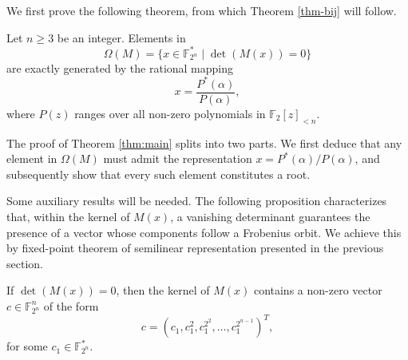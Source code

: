 \documentclass[hidelinks,onefignum,onetabnum]{siamart251216}
\theoremstyle{definition}
\theoremstyle{remark}
\begin{document}
We first prove the following theorem, from which Theorem \ref{thm-bij} will follow.


\begin{theorem}
	\label{thm:main}
	Let $n\ge 3$ be an integer. Elements in $$\Omega (M)=\{ x\in\mathbb F_{2^n}^*\mid \det (M(x))=0\}$$ are exactly generated by the rational mapping
	$$
	x = \frac{P^*(\alpha)}{P(\alpha)},
	$$
	where $P(z)$ ranges over all non-zero polynomials in $\mathbb{F}_2[z]_{<n}$.
\end{theorem}




The proof of Theorem \ref{thm:main} splits into two parts. We first deduce that any element in $\Omega (M)$ must admit the representation $x = P^*(\alpha)/P(\alpha)$, and subsequently show that every such element constitutes a root. 

Some auxiliary results will be needed. The following proposition characterizes that, within the kernel of $M(x)$, a vanishing determinant guarantees the presence of a vector whose components follow a Frobenius orbit. We achieve this by fixed-point theorem of semilinear representation presented in the previous section.

\begin{proposition}
	\label{prop:kernel_special_vector}
	If $\det(M(x)) = 0$, then the kernel of $ M(x)$ contains a non-zero vector $c \in \mathbb{F}_{2^n}^n$ of the form 
	\begin{equation}
		c = \left(c_1, c_1^2, c_1^{2^2}, \dots, c_1^{2^{n-1}}\right)^T,
	\end{equation}
	for some $c_1 \in \mathbb{F}_{2^n}^{*}$.
\end{proposition}
\end{document}
